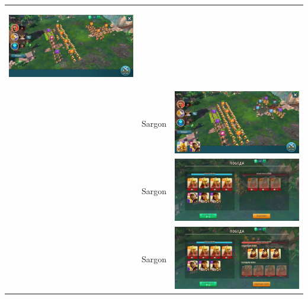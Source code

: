 \begin{longtable}{|c|c|c|}
    \hypertarget{fight31}{\includegraphics[width=0.75\linewidth]{./parts/media/TreasureHunt/31/sargon/photo_2022-04-07_10-05-22.jpg}} \\
    & Sargon &
    \includegraphics[width=0.75\linewidth]{./parts/media/TreasureHunt/31/sargon/photo_2022-04-07_10-05-08.jpg} \\
    & Sargon &
    \includegraphics[width=0.75\linewidth]{./parts/media/TreasureHunt/31/sargon/photo_2022-04-07_10-05-25.jpg} \\
    & Sargon &
    \includegraphics[width=0.75\linewidth]{./parts/media/TreasureHunt/31/sargon/photo_2022-04-07_10-05-18.jpg} \\

\end{longtable}
